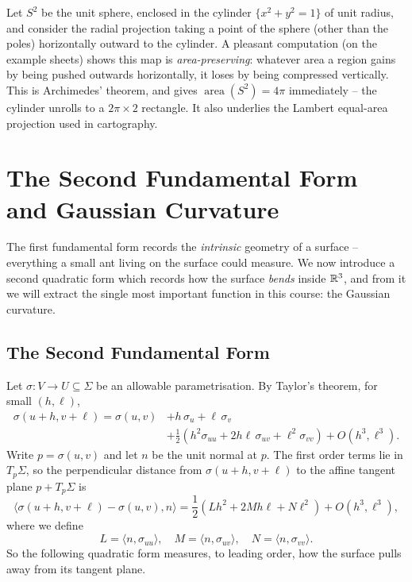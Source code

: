 \documentclass[a4paper]{scrartcl}
\begin{document}
\begin{example}[Archimedes]
    Let $S^2$ be the unit sphere, enclosed in the cylinder $\{x^2 + y^2 = 1\}$ of unit radius, and consider the radial projection taking a point of the sphere (other than the poles) horizontally outward to the cylinder. A pleasant computation (on the example sheets) shows this map is \emph{area-preserving}: whatever area a region gains by being pushed outwards horizontally, it loses by being compressed vertically. This is Archimedes' theorem, and gives $\operatorname{area}(S^2) = 4\pi$ immediately -- the cylinder unrolls to a $2\pi \times 2$ rectangle. It also underlies the Lambert equal-area projection used in cartography.
\end{example}

\section{The Second Fundamental Form and Gaussian Curvature}

The first fundamental form records the \emph{intrinsic} geometry of a surface -- everything a small ant living on the surface could measure. We now introduce a second quadratic form which records how the surface \emph{bends} inside $\mathbb{R}^3$, and from it we will extract the single most important function in this course: the Gaussian curvature.

\subsection{The Second Fundamental Form}

Let $\sigma: V \rightarrow U \subseteq \Sigma$ be an allowable parametrisation. By Taylor's theorem, for small $(h, \ell)$,
\begin{align*}
    \sigma(u + h, v + \ell) = \sigma(u, v) &+ h\, \sigma_u + \ell \, \sigma_v \\
    &+ \frac{1}{2}\left(h^2 \sigma_{uu} + 2 h \ell \, \sigma_{uv} + \ell^2 \sigma_{vv}\right) + O(h^3, \ell^3).
\end{align*}
Write $p = \sigma(u,v)$ and let $n$ be the unit normal at $p$. The first order terms lie in $T_p\Sigma$, so the perpendicular distance from $\sigma(u + h, v+\ell)$ to the affine tangent plane $p + T_p\Sigma$ is
$$
\langle \sigma(u+h, v+\ell) - \sigma(u,v), n \rangle = \frac{1}{2}\left(L h^2 + 2M h\ell + N \ell^2\right) + O(h^3, \ell^3),
$$
where we define
$$
L = \langle n, \sigma_{uu}\rangle, \quad M = \langle n, \sigma_{uv} \rangle, \quad N = \langle n, \sigma_{vv} \rangle.
$$
So the following quadratic form measures, to leading order, how the surface pulls away from its tangent plane.
\end{document}
